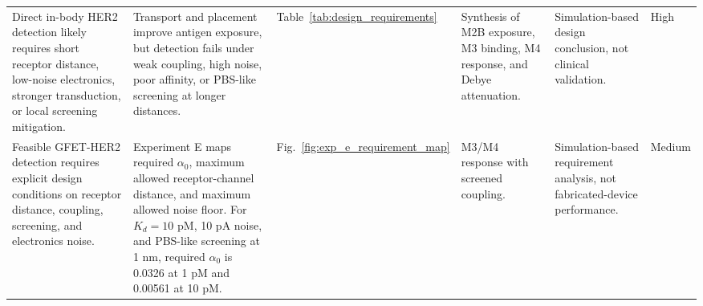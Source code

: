 \begin{longtable}{@{}p{}p{}p{}p{}p{}p{}@{}}
Direct in-body HER2 detection likely requires short receptor distance, low-noise electronics, stronger transduction, or local screening mitigation. & Transport and placement improve antigen exposure, but detection fails under weak coupling, high noise, poor affinity, or PBS-like screening at longer distances. & Table~\ref{tab:design_requirements} & Synthesis of M2B exposure, M3 binding, M4 response, and Debye attenuation. & Simulation-based design conclusion, not clinical validation. & High\\
Feasible GFET-HER2 detection requires explicit design conditions on receptor distance, coupling, screening, and electronics noise. & Experiment E maps required $\alpha_0$, maximum allowed receptor-channel distance, and maximum allowed noise floor. For $K_d=10$ pM, 10 pA noise, and PBS-like screening at 1 nm, required $\alpha_0$ is 0.0326 at 1 pM and 0.00561 at 10 pM. & Fig.~\ref{fig:exp_e_requirement_map} & M3/M4 response with screened coupling. & Simulation-based requirement analysis, not fabricated-device performance. & Medium\\
\bottomrule
\end{longtable}
\endgroup

